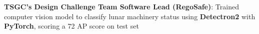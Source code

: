 \documentclass[letterpaper,11pt]{article}
\makeatletter
\newcommand{\resumeItem}[1]{
  \item\small{
    {#1 \vspace{-2pt}}
  }
}
\newcommand{\resumeProjectHeading}[2]{
    \item
    \begin{tabular*}{0.97\textwidth}{l@{\extracolsep{\fill}}r}
      \small#1 & #2 \\
    \end{tabular*}\vspace{-7pt}
}
\newcommand{\resumeSubHeadingListStart}{\begin{itemize}[leftmargin=0.15in, label={}]}
\newcommand{\resumeSubHeadingListEnd}{\end{itemize}}
\newcommand{\resumeItemListStart}{\begin{itemize}}
\newcommand{\resumeItemListEnd}{\end{itemize}\vspace{-5pt}}
\makeatother
\begin{document}
\begin{itemize}[]
	      {\item{\textbf{TSGC's Design Challenge Team Software Lead (RegoSafe)}{: Trained computer vision model to classify lunar machinery status using
		      \textbf{Detectron2} with \textbf{PyTorch}, scoring a 72 AP score on test set
	      }}}






\end{itemize}


\end{document}
